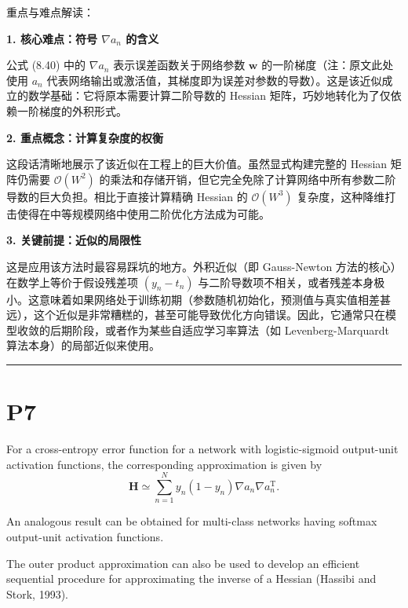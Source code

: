 \documentclass{article}
\begin{document}
{\color{blue}
重点与难点解读：

\textbf{1. 核心难点：符号 $\nabla a_n$ 的含义}

公式 (8.40) 中的 $\nabla a_n$ 表示误差函数关于网络参数 $\mathbf{w}$ 的一阶梯度（注：原文此处使用 $a_n$ 代表网络输出或激活值，其梯度即为误差对参数的导数）。这是该近似成立的数学基础：它将原本需要计算二阶导数的 Hessian 矩阵，巧妙地转化为了仅依赖一阶梯度的外积形式。

\textbf{2. 重点概念：计算复杂度的权衡}

这段话清晰地展示了该近似在工程上的巨大价值。虽然显式构建完整的 Hessian 矩阵仍需要 $\mathcal{O}(W^2)$ 的乘法和存储开销，但它完全免除了计算网络中所有参数二阶导数的巨大负担。相比于直接计算精确 Hessian 的 $\mathcal{O}(W^3)$ 复杂度，这种降维打击使得在中等规模网络中使用二阶优化方法成为可能。

\textbf{3. 关键前提：近似的局限性}

这是应用该方法时最容易踩坑的地方。外积近似（即 Gauss-Newton 方法的核心）在数学上等价于假设残差项 $(y_n - t_n)$ 与二阶导数项不相关，或者残差本身极小。这意味着如果网络处于训练初期（参数随机初始化，预测值与真实值相差甚远），这个近似是非常糟糕的，甚至可能导致优化方向错误。因此，它通常只在模型收敛的后期阶段，或者作为某些自适应学习率算法（如 Levenberg-Marquardt 算法本身）的局部近似来使用。

}

\noindent\rule{\linewidth}{0.4pt}

\section{P7}

For a cross-entropy error function for a network with logistic-sigmoid output-unit activation functions, the corresponding approximation is given by
\begin{equation}
    \mathbf{H} \simeq \sum_{n=1}^N y_n (1 - y_n) \nabla a_n \nabla a_n^\mathrm{T}.
    \tag{8.41}
\end{equation}

An analogous result can be obtained for multi-class networks having softmax output-unit activation functions. 

The outer product approximation can also be used to develop an efficient sequential procedure for approximating the inverse of a Hessian (Hassibi and Stork, 1993).
\end{document}
